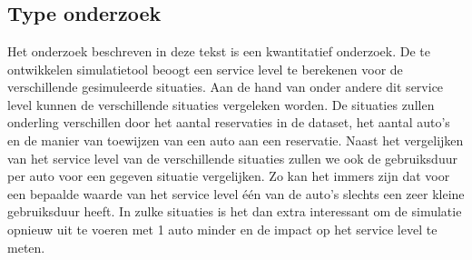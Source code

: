
\chapter{}
\label{ch:methodologie}



\section{Type onderzoek}
Het onderzoek beschreven in deze tekst is een kwantitatief onderzoek. De te ontwikkelen simulatietool beoogt een service level te berekenen voor de verschillende gesimuleerde situaties. Aan de hand van onder andere dit service level kunnen de verschillende situaties vergeleken worden. De situaties zullen onderling verschillen door het aantal reservaties in de dataset, het aantal auto's en de manier van toewijzen van een auto aan een reservatie. Naast het vergelijken van het service level van de verschillende situaties zullen we ook de gebruiksduur per auto voor een gegeven situatie vergelijken. Zo kan het immers zijn dat voor een bepaalde waarde van het service level één van de auto's slechts een zeer kleine gebruiksduur heeft. In zulke situaties is het dan extra interessant om de simulatie opnieuw uit te voeren met 1 auto minder en de impact op het service level te meten. 




